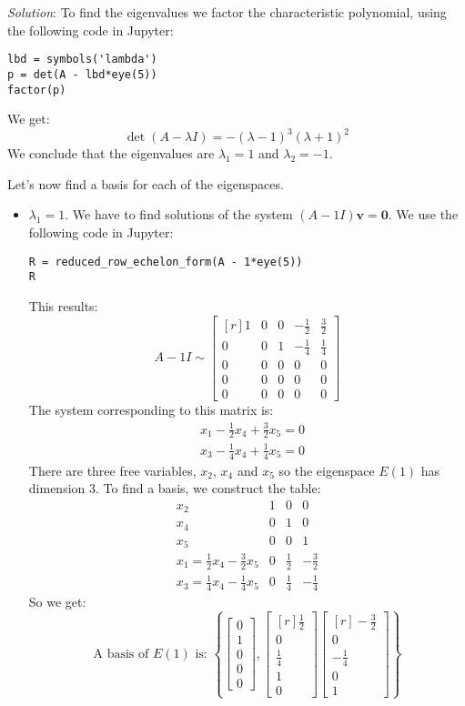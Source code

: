\documentclass[12pt]{article}
\begin{document}
\emph{Solution}:
To find the eigenvalues we factor the characteristic polynomial, using the following code in Jupyter:
\begin{lstlisting}
lbd = symbols('lambda')
p = det(A - lbd*eye(5))
factor(p)
\end{lstlisting}
We get:
\[
\det(A-\lambda I)=- \left(\lambda - 1\right)^{3} \left(\lambda + 1\right)^{2}
\]
We conclude that the eigenvalues are $\lambda_1=1$ and $\lambda_2=-1$.

Let's now find a basis for each of the eigenspaces.

\begin{itemize}

\item $\lambda_1=1$. We have to find solutions of the system $(A-1I)\mathbf{v}=\mathbf{0}$. 
We use the following code in Jupyter:
\begin{lstlisting}
R = reduced_row_echelon_form(A - 1*eye(5))
R
\end{lstlisting}
This results:
\[
A-1I\sim\left[\begin{matrix*}[r]1 & 0 & 0 & - \frac{1}{2} & \frac{3}{2}\\0 & 0 & 1 & - \frac{1}{4} & \frac{1}{4}\\0 & 0 & 0 & 0 & 0\\0 & 0 & 0 & 0 & 0\\0 & 0 & 0 & 0 & 0\end{matrix*}\right]
\]
The system corresponding to this matrix is:
\begin{align*}
&x_1-\frac{1}{2}x_4+\frac{3}{2}x_5=0\\
&x_3-\frac{1}{4}x_4+\frac{1}{4}x_5=0
\end{align*}
There are three free variables, $x_2$, $x_4$ and $x_5$ so the eigenspace $E(1)$ has dimension $3$. To find a basis, we construct the table:
\[
\begin{array}{c|rrr}
x_2 & 1 & 0 & 0\\
x_4 & 0 & 1 & 0\\
x_5 & 0 & 0 & 1\\
x_1=\frac{1}{2}x_4-\frac{3}{2}x_5 & 0 & \frac{1}{2} & -\frac{3}{2}\\
x_3=\frac{1}{4}x_4-\frac{1}{4}x_5 & 0 & \frac{1}{4} & -\frac{1}{4}
\end{array}
\]
So we get:
\[
\text{A basis of $E(1)$ is: } 
\left\{
\begin{bmatrix*}0\\1\\0\\0\\0\end{bmatrix*},
\begin{bmatrix*}[r]\frac{1}{2}\\0\\\frac{1}{4}\\1\\0\end{bmatrix*}
\begin{bmatrix*}[r]-\frac{3}{2}\\0\\-\frac{1}{4}\\0\\1\end{bmatrix*}
\right\}
\]


\end{itemize}
\end{document}
